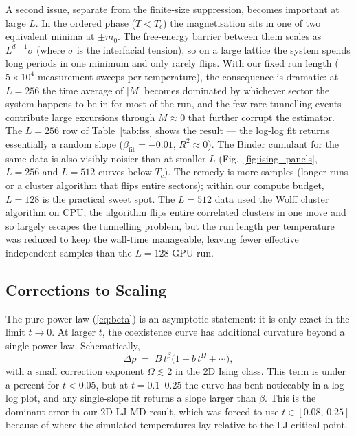 \documentclass[12pt,a4paper]{article}
\begin{document}
A second issue, separate from the finite-size suppression, becomes important at large
$L$. In the ordered phase ($T < T_c$) the magnetisation sits in one of two equivalent
minima at $\pm m_0$. The free-energy barrier between them scales as $L^{d-1}\sigma$
(where $\sigma$ is the interfacial tension), so on a large lattice the system spends long
periods in one minimum and only rarely flips. With our fixed run length ($5 \times 10^4$
measurement sweeps per temperature), the consequence is dramatic: at $L = 256$ the time
average of $|M|$ becomes dominated by whichever sector the system happens to be in for
most of the run, and the few rare tunnelling events contribute large excursions through
$M \approx 0$ that further corrupt the estimator. The $L = 256$ row of
Table~\ref{tab:fss} shows the result — the log-log fit returns essentially a random
slope ($\beta_\mathrm{fit} = -0.01$, $R^2 \approx 0$). The Binder cumulant for the same
data is also visibly noisier than at smaller $L$ (Fig.~\ref{fig:ising_panels}, $L = 256$
and $L = 512$ curves below $T_c$). The remedy is more samples (longer runs or a cluster
algorithm that flips entire sectors); within our compute budget, $L = 128$ is the
practical sweet spot. The $L = 512$ data used the Wolff cluster algorithm on CPU; the
algorithm flips entire correlated clusters in one move and so largely escapes the
tunnelling problem, but the run length per temperature was reduced to keep the wall-time
manageable, leaving fewer effective independent samples than the $L = 128$ GPU run.

\subsection{Corrections to Scaling}

The pure power law (\ref{eq:beta}) is an asymptotic statement: it is only exact in the
limit $t \to 0$. At larger $t$, the coexistence curve has additional curvature beyond a
single power law. Schematically,
\begin{equation}
  \Delta\rho \;=\; B\,t^\beta\bigl(1 + b\,t^\Omega + \cdots\bigr),
  \label{eq:corrections}
\end{equation}
with a small correction exponent $\Omega \lesssim 2$ in the 2D Ising class. This term is
under a percent for $t < 0.05$, but at $t = 0.1$--$0.25$ the curve has bent noticeably
in a log-log plot, and any single-slope fit returns a slope larger than $\beta$. This is
the dominant error in our 2D LJ MD result, which was forced to use $t \in
[0.08,\, 0.25]$ because of where the simulated temperatures lay relative to the LJ
critical point.
\end{document}
